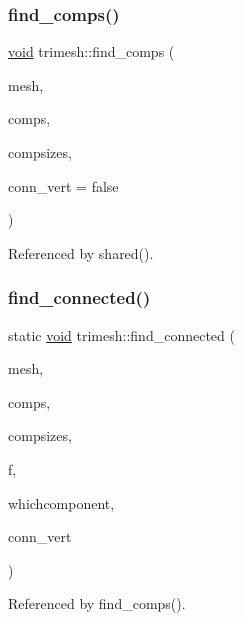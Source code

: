 \subsubsection{\texorpdfstring{find\+\_\+comps()}{find\_comps()}\hspace{0.1cm}{\footnotesize\ttfamily [2/2]}}
{\footnotesize\ttfamily \hyperlink{namespacetrimesh_a784ddfd979e1c579bda795a8edfc3f43}{void} trimesh\+::find\+\_\+comps (\begin{DoxyParamCaption}\item[{\hyperlink{classtrimesh_1_1TriMesh}{Tri\+Mesh} $\ast$}]{mesh,  }\item[{\+::std\+::vector$<$ int $>$ \&}]{comps,  }\item[{\+::std\+::vector$<$ int $>$ \&}]{compsizes,  }\item[{bool}]{conn\+\_\+vert = {\ttfamily false} }\end{DoxyParamCaption})}



Referenced by shared().

\mbox{\label{namespacetrimesh_a231c571f41f3dabfc4ba15ae283a059a}} 
\subsubsection{\texorpdfstring{find\+\_\+connected()}{find\_connected()}}
{\footnotesize\ttfamily static \hyperlink{namespacetrimesh_a784ddfd979e1c579bda795a8edfc3f43}{void} trimesh\+::find\+\_\+connected (\begin{DoxyParamCaption}\item[{const \hyperlink{classtrimesh_1_1TriMesh}{Tri\+Mesh} $\ast$}]{mesh,  }\item[{vector$<$ int $>$ \&}]{comps,  }\item[{vector$<$ int $>$ \&}]{compsizes,  }\item[{int}]{f,  }\item[{int}]{whichcomponent,  }\item[{bool}]{conn\+\_\+vert }\end{DoxyParamCaption})\hspace{0.3cm}{\ttfamily [static]}}



Referenced by find\+\_\+comps().

\mbox{\label{namespacetrimesh_afd23e86e789949b55df12657a3c4e5e9}} 
